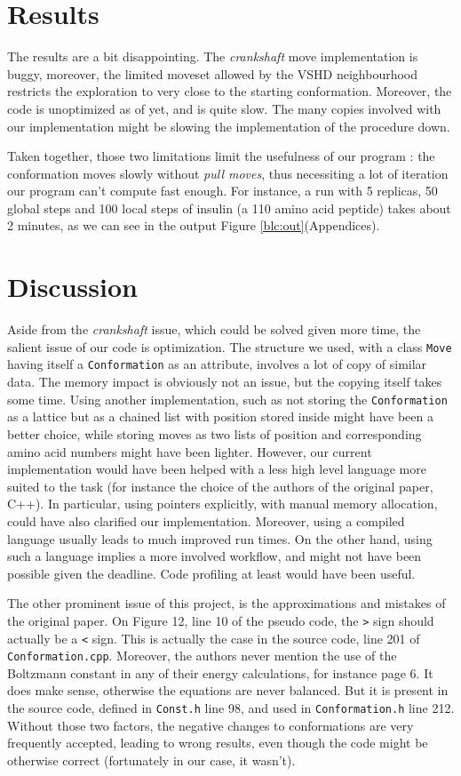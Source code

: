 \documentclass[a4paper, 12pt]{article}
\begin{document}
\section*{Results}
\label{sec:org1722dca}
The results are a bit disappointing. The \emph{crankshaft} move implementation is buggy, moreover, the limited moveset allowed by the VSHD neighbourhood restricts the exploration to very close to the starting conformation. Moreover, the code is unoptimized as of yet, and is quite slow. The many copies involved with our implementation might be slowing the implementation of the procedure down.

Taken together, those two limitations limit the usefulness of our program : the conformation moves slowly without \emph{pull moves}, thus necessiting a lot of iteration our program can't compute fast enough. For instance, a run with 5 replicas, 50 global steps and 100 local steps of insulin (a 110 amino acid peptide) takes about 2 minutes, as we can see in the output Figure \ref{blc:out}(Appendices).

\section*{Discussion}
\label{sec:orgbbe3cc7}
Aside from the \emph{crankshaft} issue, which could be solved given more time, the salient issue of our code is optimization. The structure we used, with a class \texttt{Move} having itself a \texttt{Conformation} as an attribute, involves a lot of copy of similar data. The memory impact is obviously not an issue, but the copying itself takes some time. Using another implementation, such as not storing the \texttt{Conformation} as a lattice but as a chained list with position stored inside might have been a better choice, while storing moves as two lists of position and corresponding amino acid numbers might have been lighter. However, our current implementation would have been helped with a less high level language more suited to the task (for instance the choice of the authors of the original paper, C++). In particular, using pointers explicitly, with manual memory allocation, could have also clarified our implementation. Moreover, using a compiled language usually leads to much improved run times. On the other hand, using such a language  implies a more involved workflow, and might not have been possible given the deadline. Code profiling at least would have been useful.

The other prominent issue of this project, is the approximations and mistakes of the original paper. On Figure 12, line 10 of the pseudo code, the \texttt{>} sign should actually be a \texttt{<} sign. This is actually the case in the source code, line 201 of \texttt{Conformation.cpp}. Moreover, the authors never mention the use of the Boltzmann constant in any of their energy calculations, for instance page 6. It does make sense, otherwise the equations are never balanced. But it is present in the source code, defined in \texttt{Const.h} line 98, and used in \texttt{Conformation.h} line 212. Without those two factors, the negative changes to conformations are very frequently accepted, leading to wrong results, even though the code might be otherwise correct (fortunately in our case, it wasn't).
\end{document}

